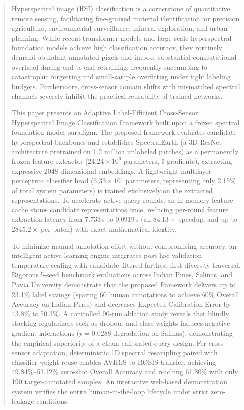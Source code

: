\documentclass[conference,letterpaper]{IEEEtran}
\begin{document}
\begin{abstract}
Hyperspectral image (HSI) classification is a cornerstone of quantitative remote sensing, facilitating fine-grained material identification for precision agriculture, environmental surveillance, mineral exploration, and urban planning. While recent transformer models and large-scale hyperspectral foundation models achieve high classification accuracy, they routinely demand abundant annotated pixels and impose substantial computational overhead during end-to-end retraining, frequently succumbing to catastrophic forgetting and small-sample overfitting under tight labeling budgets. Furthermore, cross-sensor domain shifts with mismatched spectral channels severely inhibit the practical reusability of trained networks. 

\vspace{0.3em}
This paper presents an Adaptive Label-Efficient Cross-Sensor Hyperspectral Image Classification Framework built upon a frozen spectral foundation model paradigm. The proposed framework evaluates candidate hyperspectral backbones and establishes SpectralEarth (a 3D-ResNet architecture pretrained on 1.2 million unlabeled patches) as a permanently frozen feature extractor ($24.24\times 10^6$ parameters, 0 gradients), extracting expressive 2048-dimensional embeddings. A lightweight multilayer perceptron classifier head ($5.33\times 10^5$ parameters, representing only 2.15\% of total system parameters) is trained exclusively on the extracted representations. To accelerate active query rounds, an in-memory feature cache stores candidate representations once, reducing per-round feature extraction latency from 7.733\,s to 0.0919\,s (an $84.13\times$ speedup, and up to $2845.2\times$ per patch) with exact mathematical identity. 

\vspace{0.3em}
To minimize manual annotation effort without compromising accuracy, an intelligent active learning engine integrates post-hoc validation temperature scaling with candidate-filtered farthest-first diversity traversal. Rigorous 5-seed benchmark evaluations across Indian Pines, Salinas, and Pavia University demonstrate that the proposed framework delivers up to 23.1\% label savings (sparing 60 human annotations to achieve 60\% Overall Accuracy on Indian Pines) and decreases Expected Calibration Error by 43.8\% to 50.3\%. A controlled 90-run ablation study reveals that blindly stacking regularizers such as dropout and class weights induces negative gradient interactions ($p = 0.0288$ degradation on Salinas), demonstrating the empirical superiority of a clean, calibrated query design. For cross-sensor adaptation, deterministic 1D spectral resampling paired with classifier weight reuse enables AVIRIS-to-ROSIS transfer, achieving 49.84\%--54.12\% zero-shot Overall Accuracy and reaching 61.80\% with only 190 target-annotated samples. An interactive web-based demonstration system verifies the entire human-in-the-loop lifecycle under strict zero-leakage conditions.
\end{abstract}
\end{document}
